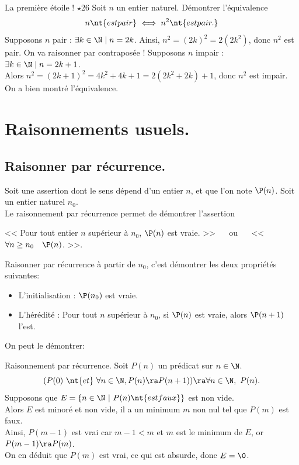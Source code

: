 \documentclass[11pt]{article}
\begin{document}
\begin{ex}{La première étoile ! $\star$}{26}
    Soit $n$ un entier naturel. Démontrer l'équivalence
    \begin{equation*}
        n \nt{ est pair} \iff n^2 \nt{ est pair.}
    \end{equation*}
    \tcblower
    \fbox{$\ra$} Supposons $n$ pair : $\exists k \in \N\mid n = 2k$. Ainsi, $n^2=(2k)^2=2(2k^2)$, donc $n^2$ est pair.\n
    \fbox{$\la$} On va raisonner par contraposée ! Supposons $n$ impair : $\exists k \in \N \mid n = 2k+1$.\\
    Alors $n^2=(2k+1)^2=4k^2+4k+1=2(2k^2+2k) + 1$, donc $n^2$ est impair.\\
    On a bien montré l'équivalence.
\end{ex}

\section{Raisonnements usuels.}

\subsection{Raisonner par récurrence.}

Soit une assertion dont le sens dépend d'un entier $n$, et que l'on note $\P(n)$. Soit un entier naturel $n_0$.\\
Le raisonnement par récurrence permet de démontrer l'assertion
\begin{center}
    << Pour tout entier $n$ supérieur à $n_0$, $\P(n)$ est vraie. >> $\quad$ ou $\quad$ << $\forall n \geq n_0 \quad \P(n)$. >>.
\end{center}

\noindent Raisonner par récurrence à partir de $n_0$, c'est démontrer les deux propriétés suivantes:
\begin{itemize}[topsep=0pt,itemsep=-0.9 ex]
    \item L'initialisation : $\P(n_0)$ est vraie.
    \item L'hérédité : Pour tout $n$ supérieur à $n_0$, si $\P(n)$ est vraie, alors $\P(n+1)$ l'est.
\end{itemize}
On peut le démontrer:
\vspace*{0.3cm}

\begin{thm}{Raisonnement par récurrence.}{}
    Soit $P(n)$ un prédicat sur $n\in\N$.
    \begin{equation*}
        (P(0) ~ \nt{et} ~ \forall n\in\N, P(n) \ra P(n+1)) \ra \forall n\in\N, ~ P(n).
    \end{equation*}
    \tcblower
    Supposons que $E=\{n\in\N ~ | ~ P(n) \nt{ est faux}\}$ est non vide.\\
    Alors $E$ est minoré et non vide, il a un minimum $m$ non nul tel que $P(m)$ est faux.\\
    Ainsi, $P(m-1)$ est vrai car $m-1<m$ et $m$ est le minimum de $E$, or $P(m-1)\ra P(m)$.\\
    On en déduit que $P(m)$ est vrai, ce qui est absurde, donc $E=\0$.
\end{thm}
\end{document}
